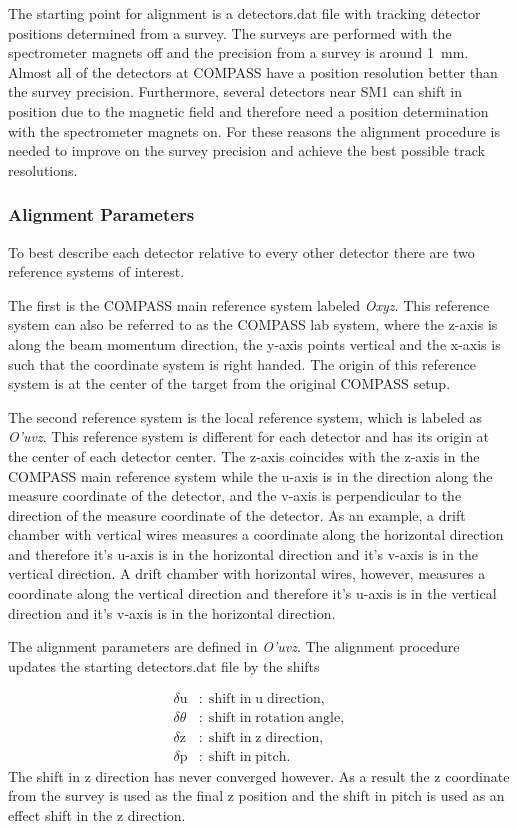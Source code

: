 The starting point for alignment is a detectors.dat file with tracking detector
positions determined from a survey.  The surveys are performed with the
spectrometer magnets off and the precision from a survey is around 1~mm.  Almost
all of the detectors at COMPASS have a position resolution better than the
survey precision.  Furthermore, several detectors near SM1 can shift in position
due to the magnetic field and therefore need a position determination with the
spectrometer magnets on.  For these reasons the alignment procedure is needed to
improve on the survey precision and achieve the best possible track resolutions.

\subsubsection{Alignment Parameters}

To best describe each detector relative to every other detector there are two
reference systems of interest.

The first is the COMPASS main reference system labeled \textit{Oxyz}.  This
reference system can also be referred to as the COMPASS lab system, where the
z-axis is along the beam momentum direction, the y-axis points vertical and the
x-axis is such that the coordinate system is right handed.  The origin of this
reference system is at the center of the target from the original COMPASS setup.

The second reference system is the local reference system, which is labeled as
\textit{O'uvz}.  This reference system is different for each detector and has
its origin at the center of each detector center.  The z-axis coincides with the
z-axis in the COMPASS main reference system while the u-axis is in the direction
along the measure coordinate of the detector, and the v-axis is perpendicular to
the direction of the measure coordinate of the detector.  As an example, a drift
chamber with vertical wires measures a coordinate along the horizontal direction
and therefore it's u-axis is in the horizontal direction and it's v-axis is in
the vertical direction.  A drift chamber with horizontal wires, however,
measures a coordinate along the vertical direction and therefore it's u-axis is
in the vertical direction and it's v-axis is in the horizontal direction.

The alignment parameters are defined in \textit{O'uvz}.  The alignment procedure
updates the starting detectors.dat file by the shifts

\begin{align}
  \delta \mathrm{u} & \mathrm{: \; shift \; in \; u \; direction,}  \\
  \delta \theta & \mathrm{: \; shift \; in \; rotation \; angle,}  \\
  \delta \textrm{z} & \mathrm{: \; shift \; in \; z \; direction,}  \\
  \delta \textrm{p} & \mathrm{: \; shift \; in \; pitch.} 
\end{align}
\noindent
The shift in z direction has never converged however.  As a result the z
coordinate from the survey is used as the final z position and the shift in
pitch is used as an effect shift in the z direction.

